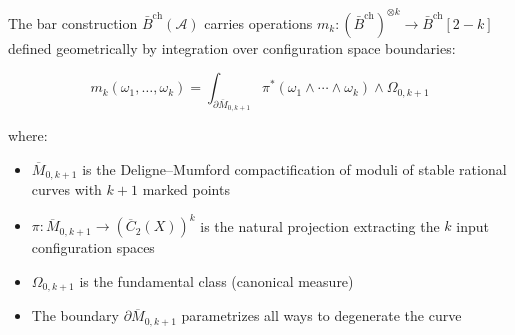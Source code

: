 \begin{theorem}\label{thm:ainfty-moduli}
The bar construction $\bar{B}^{\text{ch}}(\mathcal{A})$ carries operations 
$m_k: (\bar{B}^{\text{ch}})^{\otimes k} \to \bar{B}^{\text{ch}}[2-k]$ defined 
geometrically by integration over configuration space boundaries:

\[m_k(\omega_1, \ldots, \omega_k) = \int_{\partial \overline{M}_{0,k+1}} 
\pi^*(\omega_1 \wedge \cdots \wedge \omega_k) \wedge \Omega_{0,k+1}\]

where:
\begin{itemize}
\item $\overline{M}_{0,k+1}$ is the Deligne--Mumford compactification of moduli 
of stable rational curves with $k+1$ marked points
\item $\pi: \overline{M}_{0,k+1} \to (\overline{C}_2(X))^k$ is the natural 
projection extracting the $k$ input configuration spaces
\item $\Omega_{0,k+1}$ is the fundamental class (canonical measure)
\item The boundary $\partial \overline{M}_{0,k+1}$ parametrizes all ways to 
degenerate the curve
\end{itemize}
\end{theorem}

